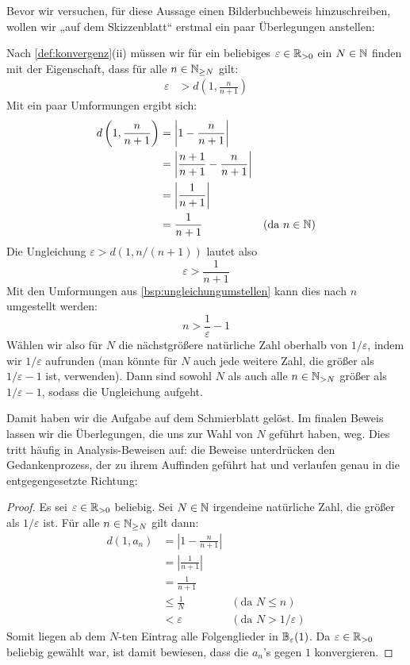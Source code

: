 \begin{bem}
    Bevor wir versuchen, für diese Aussage einen Bilderbuchbeweis hinzuschreiben, wollen wir „auf dem Skizzenblatt“ erstmal ein paar Überlegungen anstellen:
    
    Nach \cref{def:konvergenz}(ii) müssen wir für ein beliebiges $\varepsilon \in \mathbb R_{>0}$ ein $N\in \mathbb N$ finden mit der Eigenschaft, dass für alle $n\in \mathbb N_{\ge N}$ gilt:
    \begin{align*}
        \varepsilon &  > d\left(1,\frac{n}{n+1}\right)
    \end{align*}
    Mit ein paar Umformungen ergibt sich:
    \begin{align*}
        d\left(1,\frac{n}{n+1}\right) & = \left| 1-\frac{n}{n+1}\right| \\
        & = \left| \frac{n+1}{n+1} - \frac{n}{n+1} \right| \\
        & = \left| \frac{1}{n+1}\right| \\
        & = \frac{1}{n+1} & (\text{da $n\in \mathbb N$})
    \end{align*}
    Die Ungleichung $\varepsilon >d(1,n/(n+1))$ lautet also
        \[ \varepsilon > \frac{1}{n+1} \]
    Mit den Umformungen aus \cref{bsp:ungleichungumstellen} kann dies nach $n$ umgestellt werden:
        \[ n > \frac{1}{\varepsilon} -1  \]
    Wählen wir also für $N$ die nächstgrößere natürliche Zahl oberhalb von $1/\varepsilon$, indem wir $1/\varepsilon$ aufrunden (man könnte für $N$ auch jede weitere Zahl, die größer als $1/\varepsilon -1$ ist, verwenden). Dann sind sowohl $N$ als auch alle $n\in \mathbb N_{>N}$ größer als $1/\varepsilon- 1$, sodass die Ungleichung aufgeht.
    
    Damit haben wir die Aufgabe auf dem Schmierblatt gelöst. Im finalen Beweis lassen wir die Überlegungen, die uns zur Wahl von $N$ geführt haben, weg. Dies tritt häufig in Analysis-Beweisen auf: die Beweise unterdrücken den Gedankenprozess, der zu ihrem Auffinden geführt hat und verlaufen genau in die entgegengesetzte Richtung:
\end{bem}
\begin{proof}
    Es sei $\varepsilon \in \mathbb R_{>0}$ beliebig. Sei $N\in \mathbb N$ irgendeine natürliche Zahl, die größer als $1/\varepsilon$ ist. Für alle $n\in \mathbb N_{\ge N}$ gilt dann:
    \begingroup
    \allowdisplaybreaks
    \begin{align*}
        d(1,a_n) & = \left| 1-\frac{n}{n+1}\right| \\
        & = \left| \frac{1}{n+1} \right| \\
        & = \frac{1}{n+1} \\
        & \le \frac{1}{N} & (\text{da $N\le n$})\\
        & < \varepsilon & (\text{da $N> 1/\varepsilon$})
    \end{align*}
    \endgroup
    Somit liegen ab dem $N$-ten Eintrag alle Folgenglieder in $\mathbb B_\varepsilon(1)$. Da $\varepsilon \in \mathbb R_{>0}$ beliebig gewählt war, ist damit bewiesen, dass die $a_n$'s gegen $1$ konvergieren.
\end{proof}


